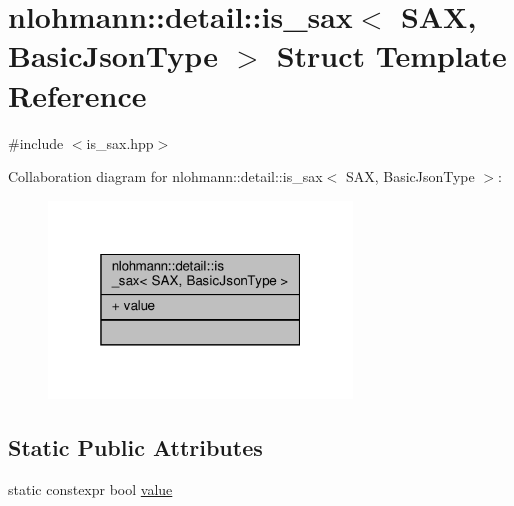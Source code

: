 \hypertarget{structnlohmann_1_1detail_1_1is__sax}{}\section{nlohmann\+:\+:detail\+:\+:is\+\_\+sax$<$ S\+AX, Basic\+Json\+Type $>$ Struct Template Reference}
\label{structnlohmann_1_1detail_1_1is__sax}


{\ttfamily \#include $<$is\+\_\+sax.\+hpp$>$}



Collaboration diagram for nlohmann\+:\+:detail\+:\+:is\+\_\+sax$<$ S\+AX, Basic\+Json\+Type $>$\+:
\nopagebreak
\begin{figure}[H]
\begin{center}
\leavevmode
\includegraphics[width=229pt]{structnlohmann_1_1detail_1_1is__sax__coll__graph}
\end{center}
\end{figure}
\subsection*{Static Public Attributes}
\begin{DoxyCompactItemize}
\item 
static constexpr bool \hyperlink{structnlohmann_1_1detail_1_1is__sax_a8ab7e51087000e948b4a2492257484dc}{value}
\end{DoxyCompactItemize}

